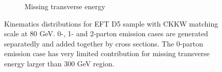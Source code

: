 \begin{figure} [thbp]
\begin{subfigure}{0.48\linewidth}
    \caption{Missing transverse energy}
  \end{subfigure}
  \caption{Kinematics distributions for EFT D5 sample with CKKW matching scale at 80 GeV. 0-, 1- and 2-parton emission cases are generated separatedly and added together by cross sections. The 0-parton emission case has very limited contribution for missing transverse energy larger than 300 GeV region.}
  \label{fig:Kine_D5_80}
\end{figure}

